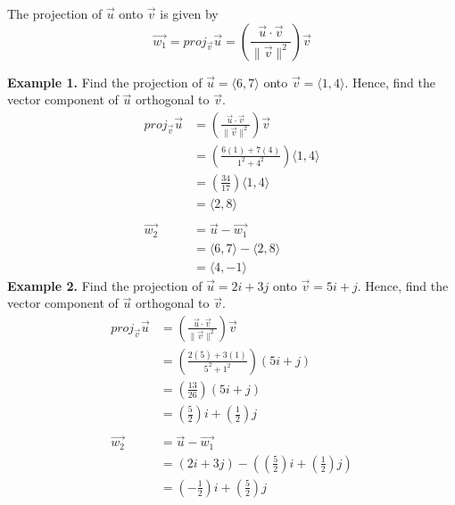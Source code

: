 \documentclass{report}
\begin{document}
The projection of $\vec{u}$ onto $\vec{v}$ is given by \[\vec{w_1} = proj_{\vec{v}}\vec{u} = \left(\frac{\vec{u} \cdot \vec{v}}{\lVert \vec{v} \rVert^2}\right)\vec{v}\]

\newpage
\noindent\textbf{Example 1. } Find the projection of $\vec{u} = \langle 6, 7 \rangle$ onto $\vec{v} = \langle 1, 4 \rangle$. Hence, find the vector component of $\vec{u}$ orthogonal to $\vec{v}$.
\begin{align*}
    proj_{\vec{v}}\vec{u} & = \left(\frac{\vec{u} \cdot \vec{v}}{\lVert \vec{v} \rVert^2}\right)\vec{v} \\
                          & = \left(\frac{6(1) + 7(4)}{1^2 + 4^2}\right)\langle 1, 4 \rangle            \\
                          & = \left(\frac{34}{17}\right)\langle 1, 4 \rangle                            \\
                          & = \langle 2, 8 \rangle                                                      \\
    \\
    \vec{w_2}             & = \vec{u} - \vec{w_1}                                                       \\
                          & = \langle 6, 7 \rangle - \langle 2, 8 \rangle                               \\
                          & = \langle 4, -1 \rangle
\end{align*}
\noindent\textbf{Example 2. } Find the projection of $\vec{u} = 2i + 3j$ onto $\vec{v} = 5i + j$. Hence, find the vector component of $\vec{u}$ orthogonal to $\vec{v}$.
\begin{align*}
    proj_{\vec{v}}\vec{u} & = \left(\frac{\vec{u} \cdot \vec{v}}{\lVert \vec{v} \rVert^2}\right)\vec{v}      \\
                          & = \left(\frac{2(5) + 3(1)}{5^2 + 1^2}\right)(5i + j)                             \\
                          & = \left(\frac{13}{26}\right)(5i + j)                                             \\
                          & = \left(\frac{5}{2}\right)i + \left(\frac{1}{2}\right)j                          \\
    \\
    \vec{w_2}             & = \vec{u} - \vec{w_1}                                                            \\
                          & = (2i + 3j) - \left(\left(\frac{5}{2}\right)i + \left(\frac{1}{2}\right)j\right) \\
                          & = \left(-\frac{1}{2}\right)i + \left(\frac{5}{2}\right)j
\end{align*}
\end{document}
